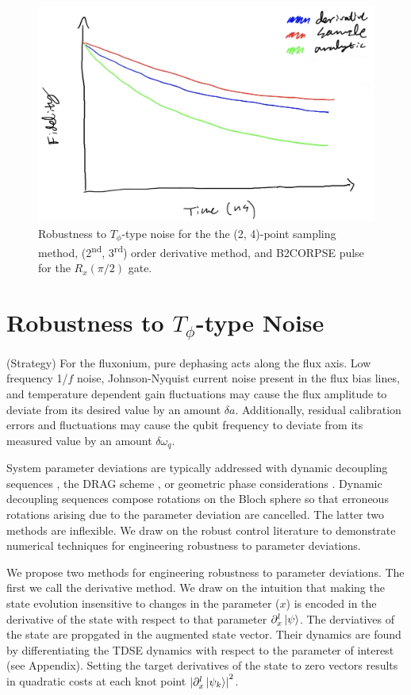 \documentclass[
  amsfonts,
  amsmath,
  tbtags,
  amssymb,
  aps,
  nobibnotes,
  twocolumn,
]{revtex4-2}
\begin{document}
\begin{figure}
  \includegraphics[width=\linewidth]{assets/t2_temp.jpg}
  \caption{Robustness to $T_{\phi}$-type noise for the
    the (2, 4)-point sampling method, (2\textsuperscript{nd}, 3\textsuperscript{rd})
    order derivative method, and B2CORPSE pulse for the $R_{x}(\pi/2)$ gate.}
\end{figure}


\section{Robustness to $T_{\phi}$-type Noise}
(Strategy) For the fluxonium, pure dephasing acts
along the flux axis. Low frequency 1/$f$ noise,
Johnson-Nyquist current noise present in the flux bias
lines, and temperature dependent gain fluctuations
may cause the flux amplitude to deviate from its
desired value by an amount $\delta a$. Additionally,
residual calibration errors and fluctuations may cause
the qubit frequency to deviate from its measured value
by an amount $\delta \omega_{q}$.

System parameter
deviations are typically addressed with dynamic decoupling
sequences \cite{merrill2014progress},
the DRAG scheme \cite{krantz2019quantum}, or
geometric phase considerations
\cite{xu2020nonadiabatic} \cite{han2020experimental}.
Dynamic decoupling sequences compose rotations on the
Bloch sphere so that erroneous rotations arising due
to the parameter deviation are cancelled.
The latter two methods are inflexible. We draw on the
robust control literature to demonstrate
numerical techniques for engineering robustness
to parameter deviations.

We propose two methods for engineering robustness
to parameter deviations. The first we call the
derivative method. We draw on the intuition that
making the state evolution insensitive to changes
in the parameter ($x$) is encoded in the derivative of
the state with respect to that parameter
$\partial_{x}^{l} \ket{\psi}$.
The derviatives of the state are propgated in the
augmented state vector. Their dynamics are found by differentiating
the TDSE dynamics with respect to the parameter of interest
(see Appendix). Setting the target derivatives of the state
to zero vectors results in quadratic costs at each
knot point
${\lvert \partial_{x}^{l} \ket{\psi_{k}} \rvert}^{2}$.
\end{document}
